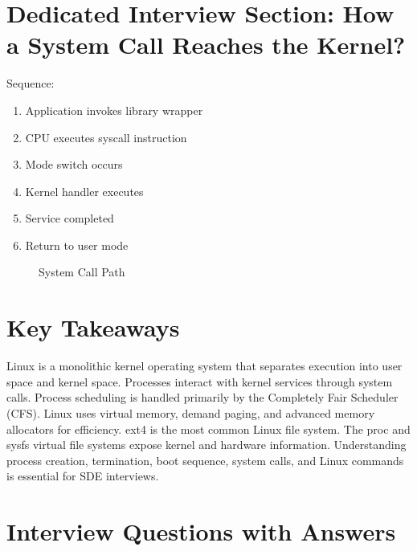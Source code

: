 \section{Dedicated Interview Section: How a System Call Reaches the Kernel?}

Sequence:

\begin{enumerate}
\item Application invokes library wrapper
\item CPU executes syscall instruction
\item Mode switch occurs
\item Kernel handler executes
\item Service completed
\item Return to user mode
\end{enumerate}

\begin{figure}[H]
\centering
{}
\caption{System Call Path}
\end{figure}

\section{Key Takeaways}

\begin{keytakeaways}
Linux is a monolithic kernel operating system that separates execution into user space and kernel space. Processes interact with kernel services through system calls. Process scheduling is handled primarily by the Completely Fair Scheduler (CFS). Linux uses virtual memory, demand paging, and advanced memory allocators for efficiency. ext4 is the most common Linux file system. The proc and sysfs virtual file systems expose kernel and hardware information. Understanding process creation, termination, boot sequence, system calls, and Linux commands is essential for SDE interviews.
\end{keytakeaways}

\section{Interview Questions with Answers}

